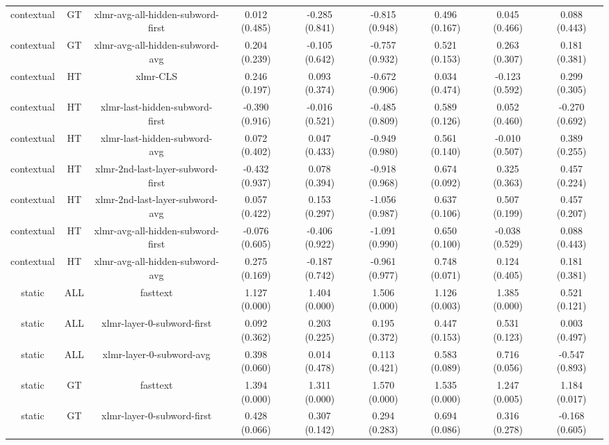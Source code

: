 \begin{sidewaystable}[htb]
\begin{tabular}{@{}ccccccccc@{}}
        contextual & GT & xlmr-avg-all-hidden-subword-first & 0.012 (0.485) & -0.285 (0.841) & -0.815 (0.948) & 0.496 (0.167) & 0.045 (0.466) & 0.088 (0.443) \\
        contextual & GT & xlmr-avg-all-hidden-subword-avg & 0.204 (0.239) & -0.105 (0.642) & -0.757 (0.932) & 0.521 (0.153) & 0.263 (0.307) & 0.181 (0.381) \\
        contextual & HT & xlmr-CLS & 0.246 (0.197) & 0.093 (0.374) & -0.672 (0.906) & 0.034 (0.474) & -0.123 (0.592) & 0.299 (0.305) \\
        contextual & HT & xlmr-last-hidden-subword-first & -0.390 (0.916) & -0.016 (0.521) & -0.485 (0.809) & 0.589 (0.126) & 0.052 (0.460) & -0.270 (0.692) \\
        contextual & HT & xlmr-last-hidden-subword-avg & 0.072 (0.402) & 0.047 (0.433) & -0.949 (0.980) & 0.561 (0.140) & -0.010 (0.507) & 0.389 (0.255) \\
        contextual & HT & xlmr-2nd-last-layer-subword-first & -0.432 (0.937) & 0.078 (0.394) & -0.918 (0.968) & 0.674 (0.092) & 0.325 (0.363) & 0.457 (0.224) \\
        contextual & HT & xlmr-2nd-last-layer-subword-avg & 0.057 (0.422) & 0.153 (0.297) & -1.056 (0.987) & 0.637 (0.106) & 0.507 (0.199) & 0.457 (0.207) \\
        contextual & HT & xlmr-avg-all-hidden-subword-first & -0.076 (0.605) & -0.406 (0.922) & -1.091 (0.990) & 0.650 (0.100) & -0.038 (0.529) & 0.088 (0.443) \\
        contextual & HT & xlmr-avg-all-hidden-subword-avg & 0.275 (0.169) & -0.187 (0.742) & -0.961 (0.977) & 0.748 (0.071) & 0.124 (0.405) & 0.181 (0.381) \\
        static & ALL & fasttext & 1.127 (0.000) & 1.404 (0.000) & 1.506 (0.000) & 1.126 (0.003) & 1.385 (0.000) & 0.521 (0.121) \\
        static & ALL & xlmr-layer-0-subword-first & 0.092 (0.362) & 0.203 (0.225) & 0.195 (0.372) & 0.447 (0.153) & 0.531 (0.123) & 0.003 (0.497) \\
        static & ALL & xlmr-layer-0-subword-avg & 0.398 (0.060) & 0.014 (0.478) & 0.113 (0.421) & 0.583 (0.089) & 0.716 (0.056) & -0.547 (0.893) \\
        static & GT & fasttext & 1.394 (0.000) & 1.311 (0.000) & 1.570 (0.000) & 1.535 (0.000) & 1.247 (0.005) & 1.184 (0.017) \\
        static & GT & xlmr-layer-0-subword-first & 0.428 (0.066) & 0.307 (0.142) & 0.294 (0.283) & 0.694 (0.086) & 0.316 (0.278) & -0.168 (0.605) \\

\end{tabular}
\end{sidewaystable}
